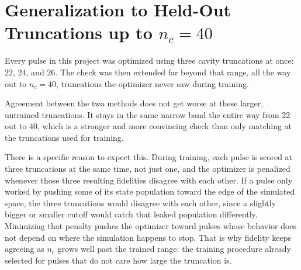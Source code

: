 \documentclass[11pt]{article}
\begin{document}
\section{Generalization to Held-Out Truncations up to $n_c = 40$}
\label{sec:generalization}

Every pulse in this project was optimized using three cavity truncations at once: 22, 24, and 26.
The check was then extended far beyond that range, all the way out to $n_c = 40$, truncations the
optimizer never saw during training.

Agreement between the two methods does not get worse at these larger, untrained truncations. It
stays in the same narrow band the entire way from 22 out to 40, which is a stronger and more
convincing check than only matching at the truncations used for training.

There is a specific reason to expect this. During training, each pulse is scored at three
truncations at the same time, not just one, and the optimizer is penalized whenever those three
resulting fidelities disagree with each other. If a pulse only worked by pushing some of its state
population toward the edge of the simulated space, the three truncations would disagree with each
other, since a slightly bigger or smaller cutoff would catch that leaked population differently.
Minimizing that penalty pushes the optimizer toward pulses whose behavior does not depend on where
the simulation happens to stop. That is why fidelity keeps agreeing as $n_c$ grows well past the
trained range: the training procedure already selected for pulses that do not care how large the
truncation is.
\end{document}

